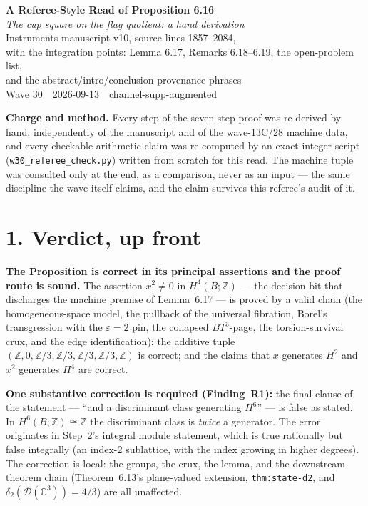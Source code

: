 \documentclass[11pt,a4paper]{article}
\newcommand{\Z}{\mathbb{Z}}
\newcommand{\C}{\mathbb{C}}
\begin{document}
\begin{center}
{\large\bfseries A Referee-Style Read of Proposition 6.16}\\[4pt]
{\itshape The cup square on the flag quotient: a hand derivation}\\[6pt]
{\small Instruments manuscript v10, source lines 1857--2084,}\\
{\small with the integration points: Lemma 6.17, Remarks 6.18--6.19, the open-problem list,}\\
{\small and the abstract/intro/conclusion provenance phrases}\\[6pt]
{\small Wave 30 \,\textbullet\, 2026-09-13 \,\textbullet\, channel-supp-augmented}
\end{center}
\vspace{4pt}

\noindent\textbf{Charge and method.} Every step of the seven-step proof was
re-derived by hand, independently of the manuscript and of the wave-13C/28
machine data, and every checkable arithmetic claim was re-computed by an
exact-integer script (\texttt{w30\_referee\_check.py}) written from scratch
for this read. The machine tuple was consulted only at the end, as a
comparison, never as an input --- the same discipline the wave itself claims,
and the claim survives this referee's audit of it.

\section*{1. Verdict, up front}

\textbf{The Proposition is correct in its principal assertions and the proof
route is sound.} The assertion $x^2\ne 0$ in $H^4(B;\Z)$ --- the decision bit
that discharges the machine premise of Lemma~6.17 --- is proved by a valid
chain (the homogeneous-space model, the pullback of the universal fibration,
Borel's transgression with the $\varepsilon=2$ pin, the collapsed
$BT^3$-page, the torsion-survival crux, and the edge identification); the
additive tuple
$(\Z,0,\Z/3,\Z/3,\Z/3,\Z/3,\Z)$ is correct; and the claims that $x$ generates
$H^2$ and $x^2$ generates $H^4$ are correct.

\textbf{One substantive correction is required (Finding~R1):} the final
clause of the statement --- ``and a discriminant class generating $H^6$'' ---
is false as stated. In $H^6(B;\Z)\cong\Z$ the discriminant class is
\emph{twice} a generator. The error originates in Step~2's integral module
statement, which is true rationally but false integrally (an index-2
sublattice, with the index growing in higher degrees). The correction is
local: the groups, the crux, the lemma, and the downstream theorem chain
(Theorem~6.13's plane-valued extension, \texttt{thm:state-d2}, and
$\delta_2(\mathcal D(\C^3))=4/3$) are all unaffected.
\end{document}
